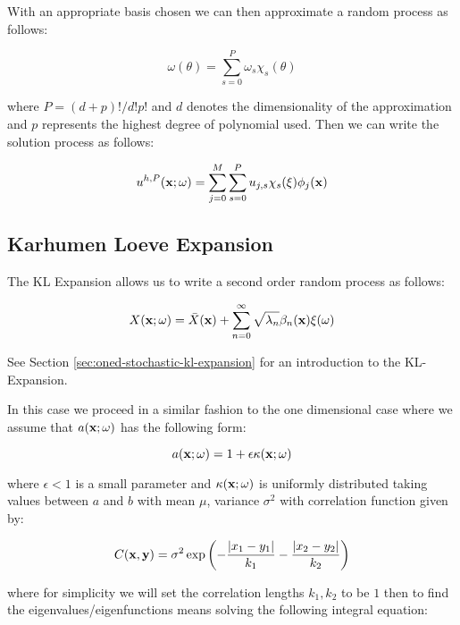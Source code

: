 With an appropriate basis chosen we can then approximate a random process as
follows:

\begin{equation}
    \omega(\theta) = \sum_{s=0}^P\omega_s\chi_s(\theta)
\end{equation}

where $P = (d + p)!/d!p!$ and $d$ denotes the dimensionality of the
approximation and $p$ represents the highest degree of polynomial used. Then we
can write the solution process as follows:

\begin{equation}\label{eq:twod-stochastic-uhp}
    u^{h,P}(\mathbf{x};\omega) = \sum_{j=0}^M\sum_{s=0}^Pu_{j,s}
        \chi_s(\xi)\phi_j(\mathbf{x})
\end{equation}


\subsection{Karhumen Loeve Expansion}

The KL Expansion allows us to write a second order random process as follows:

\begin{equation}
    X(\mathbf{x};\omega) = \bar{X}(\mathbf{x}) +
        \sum_{n=0}^\infty\sqrt{\lambda_n}\beta_n(\mathbf{x})\xi(\omega)
\end{equation}

See Section \ref{sec:oned-stochastic-kl-expansion} for an introduction to the
KL-Expansion.

In this case we proceed in a similar fashion to the one dimensional case where
we assume that $a(\mathbf{x};\omega)$ has the following form:

\begin{equation}
    a(\mathbf{x};\omega) = 1 + \epsilon\kappa(\mathbf{x};\omega)
\end{equation}

where $\epsilon < 1$ is a small parameter and $\kappa(\mathbf{x};\omega)$ is
uniformly distributed taking values between $a$ and $b$ with mean $\mu$,
variance $\sigma^2$ with correlation function given by:

\begin{equation}
    C(\mathbf{x}, \mathbf{y}) =
        \sigma^2\exp{\left(-\frac{|x_1 - y_1|}{k_1} - \frac{|x_2 - y_2|}{k_2}\right)}
\end{equation}

where for simplicity we will set the correlation lengths $k_1, k_2$ to be $1$
then to find the eigenvalues/eigenfunctions means solving the following
integral equation:


